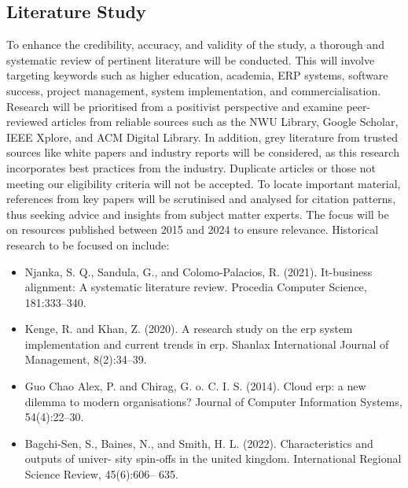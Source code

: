 \subsection{Literature Study}
\par{To enhance the credibility, accuracy, and validity of the study, a thorough and systematic review of pertinent 
literature will be conducted. This will involve targeting keywords such as higher education, academia, ERP systems, 
software success, project management, system implementation, and commercialisation. Research will be prioritised from a 
positivist perspective and examine peer-reviewed articles from reliable sources such as the NWU Library, Google Scholar, 
IEEE Xplore, and ACM Digital Library. In addition, grey literature from trusted sources like white papers and industry 
reports will be considered, as this research incorporates best practices from the industry. Duplicate articles or those 
not meeting our eligibility criteria will not be accepted. To locate important material, references from key papers will 
be scrutinised and analysed for citation patterns, thus seeking advice and insights from
subject matter experts. The focus will be on resources published between 2015 and 2024 to ensure relevance. 
Historical research to be focused on include:}
\par{\begin{itemize}
    \item Njanka, S. Q., Sandula, G., and Colomo-Palacios, R. (2021). It-business alignment: A
systematic literature review. Procedia Computer Science, 181:333–340.
    \item Kenge, R. and Khan, Z. (2020). A research study on the erp system implementation and
current trends in erp. Shanlax International Journal of Management, 8(2):34–39.
    \item Guo Chao Alex, P. and Chirag, G. o. C. I. S. (2014). Cloud erp: a new dilemma to modern
organisations? Journal of Computer Information Systems, 54(4):22–30.
    \item Bagchi-Sen, S., Baines, N., and Smith, H. L. (2022). Characteristics and outputs of univer-
sity spin-offs in the united kingdom. International Regional Science Review, 45(6):606–
635.
\end{itemize}}
